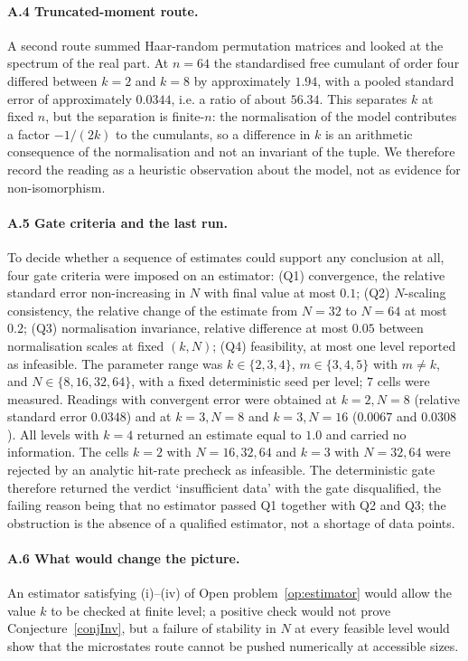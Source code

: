 \documentclass[11pt]{article}
\theoremstyle{plain}
\theoremstyle{definition}
\theoremstyle{remark}
\begin{document}
\paragraph{A.4 Truncated-moment route.} A second route summed Haar-random permutation matrices and looked at the spectrum of the real part. At $n=64$ the standardised free cumulant of order four differed between $k=2$ and $k=8$ by approximately $1.94$, with a pooled standard error of approximately $0.0344$, i.e. a ratio of about $56.34$. This separates $k$ at fixed $n$, but the separation is finite-$n$: the normalisation of the model contributes a factor $-1/(2k)$ to the cumulants, so a difference in $k$ is an arithmetic consequence of the normalisation and not an invariant of the tuple. We therefore record the reading as a heuristic observation about the model, not as evidence for non-isomorphism.

\paragraph{A.5 Gate criteria and the last run.} To decide whether a sequence of estimates could support any conclusion at all, four gate criteria were imposed on an estimator: (Q1) convergence, the relative standard error non-increasing in $N$ with final value at most $0.1$; (Q2) $N$-scaling consistency, the relative change of the estimate from $N=32$ to $N=64$ at most $0.2$; (Q3) normalisation invariance, relative difference at most $0.05$ between normalisation scales at fixed $(k,N)$; (Q4) feasibility, at most one level reported as infeasible. The parameter range was $k\in\{2,3,4\}$, $m\in\{3,4,5\}$ with $m\neq k$, and $N\in\{8,16,32,64\}$, with a fixed deterministic seed per level; $7$ cells were measured. Readings with convergent error were obtained at $k=2,N=8$ (relative standard error $0.0348$) and at $k=3,N=8$ and $k=3,N=16$ ($0.0067$ and $0.0308$). All levels with $k=4$ returned an estimate equal to $1.0$ and carried no information. The cells $k=2$ with $N=16,32,64$ and $k=3$ with $N=32,64$ were rejected by an analytic hit-rate precheck as infeasible. The deterministic gate therefore returned the verdict `insufficient data' with the gate disqualified, the failing reason being that no estimator passed Q1 together with Q2 and Q3; the obstruction is the absence of a qualified estimator, not a shortage of data points.

\paragraph{A.6 What would change the picture.} An estimator satisfying (i)--(iv) of Open problem~\ref{op:estimator} would allow the value $k$ to be checked at finite level; a positive check would not prove Conjecture~\ref{conjInv}, but a failure of stability in $N$ at every feasible level would show that the microstates route cannot be pushed numerically at accessible sizes.
\end{document}
